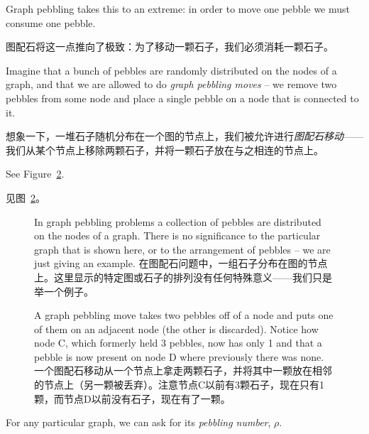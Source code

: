 Graph pebbling takes this to an extreme: in order to move one pebble
we must consume one pebble.

图配石将这一点推向了极致：为了移动一颗石子，我们必须消耗一颗石子。

Imagine that a bunch of pebbles are randomly
distributed on the nodes of a graph, and that we are allowed to do
\emph{graph pebbling moves} -- we remove two pebbles from some node
and place a single pebble on a node that is connected to it.

想象一下，一堆石子随机分布在一个图的节点上，我们被允许进行\emph{图配石移动}——我们从某个节点上移除两颗石子，并将一颗石子放在与之相连的节点上。

See Figure~\ref{fig:pebbling_move}.

见图~\ref{fig:pebbling_move}。

\begin{figure}[!hbtp]
      \begin{center}
            
      \end{center}
      \caption[Graph pebbling.图配石]{In graph pebbling problems a collection of pebbles
            are distributed on the nodes of a graph.
            There is no significance to the
            particular graph that is shown here, or to the arrangement of pebbles --
            we are just giving an example. 在图配石问题中，一组石子分布在图的节点上。这里显示的特定图或石子的排列没有任何特殊意义——我们只是举一个例子。}
      \label{fig:pebbling}
\end{figure}

\begin{figure}[!hbtp]
      \begin{center}
            
      \end{center}
      \caption[Graph pebbling move.图配石移动]{A graph pebbling move takes two pebbles off
            of a node and puts one of them on an adjacent node (the other is discarded).
            Notice how node C, which formerly held 3 pebbles, now has only 1 and that
            a pebble is now present on node D where previously there was none. 一个图配石移动从一个节点上拿走两颗石子，并将其中一颗放在相邻的节点上（另一颗被丢弃）。注意节点C以前有3颗石子，现在只有1颗，而节点D以前没有石子，现在有了一颗。}
      \label{fig:pebbling_move}
\end{figure}

For any particular graph, we can ask for its \emph{pebbling number}, $\rho$.


